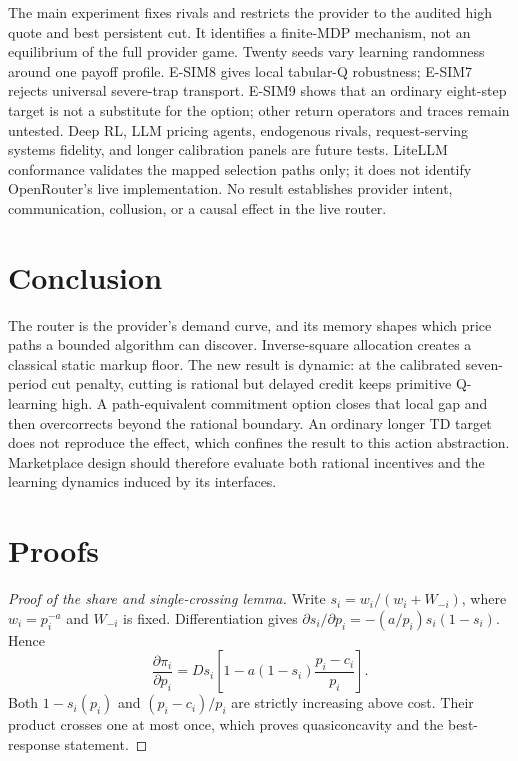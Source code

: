 \documentclass[11pt]{article}
\newcommand{\1}{\mathbf{1}}
\begin{document}
The main experiment fixes rivals and restricts the provider to the audited high
quote and best persistent cut.  It identifies a finite-MDP mechanism, not an
equilibrium of the full provider game.  Twenty seeds vary learning randomness
around one payoff profile.  E-SIM8 gives local tabular-Q robustness; E-SIM7
rejects universal severe-trap transport.  E-SIM9 shows that an ordinary
eight-step target is not a substitute for the option; other return operators
and traces remain untested.  Deep RL, LLM pricing agents, endogenous
rivals, request-serving systems fidelity, and longer calibration panels are
future tests.  LiteLLM conformance validates the mapped selection paths only;
it does not identify OpenRouter's live implementation.  No result establishes
provider intent, communication, collusion, or a
causal effect in the live router.

\section{Conclusion}

The router is the provider's demand curve, and its memory shapes which price
paths a bounded algorithm can discover.  Inverse-square allocation creates a
classical static markup floor.  The new result is dynamic: at the calibrated
seven-period cut penalty, cutting is rational but delayed credit keeps primitive
Q-learning high.  A path-equivalent commitment option closes that local gap and
then overcorrects beyond the rational boundary.  An ordinary longer TD target
does not reproduce the effect, which confines the result to this action
abstraction.  Marketplace design should
therefore evaluate both rational incentives and the learning dynamics induced by
its interfaces.

\appendix
\section{Proofs}

\begin{proof}[Proof of the share and single-crossing lemma]
Write $s_i=w_i/(w_i+W_{-i})$, where $w_i=p_i^{-a}$ and $W_{-i}$ is fixed.
Differentiation gives
$\partial s_i/\partial p_i=-(a/p_i)s_i(1-s_i)$.  Hence
\[
  \frac{\partial\pi_i}{\partial p_i}
  =Ds_i\left[1-a(1-s_i)\frac{p_i-c_i}{p_i}\right].
\]
Both $1-s_i(p_i)$ and $(p_i-c_i)/p_i$ are strictly increasing above cost.
Their product crosses one at most once, which proves quasiconcavity and the
best-response statement.
\end{proof}
\end{document}
